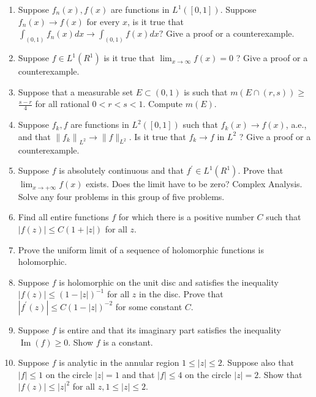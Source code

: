 \documentclass[10pt]{article}
\begin{document}
\begin{enumerate}
  \item Suppose $f_{n}(x), f(x)$ are functions in $L^{1}([0,1])$. Suppose $f_{n}(x) \rightarrow f(x)$ for every $x$, is it true that $\int_{(0,1)} f_{n}(x) d x \rightarrow \int_{(0,1)} f(x) d x ?$ Give a proof or a counterexample.

  \item Suppose $f \in L^{1}\left(R^{1}\right)$ is it true that $\lim _{x \rightarrow \infty} f(x)=0$ ? Give a proof or a counterexample.

  \item Suppose that a measurable set $E \subset(0,1)$ is such that $m(E \cap(r, s)) \geq$ $\frac{s-r}{4}$ for all rational $0<r<s<1$. Compute $m(E)$.

  \item Suppose $f_{k}, f$ are functions in $L^{2}([0,1])$ such that $f_{k}(x) \rightarrow f(x)$, a.e., and that $\left\|f_{k}\right\|_{L^{2}} \rightarrow\|f\|_{L^{2}}$. Is it true that $f_{k} \rightarrow f$ in $L^{2}$ ? Give a proof or a counterexample.

  \item Suppose $f$ is absolutely continuous and that $f^{\prime} \in L^{1}\left(R^{1}\right)$. Prove that $\lim _{x \rightarrow+\infty} f(x)$ exists. Does the limit have to be zero? Complex Analysis. Solve any four problems in this group of five problems.

  \item Find all entire functions $f$ for which there is a positive number $C$ such that $|f(z)| \leq C(1+|z|)$ for all $z$.

  \item Prove the uniform limit of a sequence of holomorphic functions is holomorphic.

  \item Suppose $f$ is holomorphic on the unit disc and satisfies the inequality $|f(z)| \leq(1-|z|)^{-1}$ for all $z$ in the disc. Prove that $\left|f^{\prime}(z)\right| \leq C(1-|z|)^{-2}$ for some constant $C$.

  \item Suppose $f$ is entire and that its imaginary part satisfies the inequality $\operatorname{Im}(f) \geq 0$. Show $f$ is a constant.

  \item Suppose $f$ is analytic in the annular region $1 \leq|z| \leq 2$. Suppose also that $|f| \leq 1$ on the circle $|z|=1$ and that $|f| \leq 4$ on the circle $|z|=2$. Show that $|f(z)| \leq|z|^{2}$ for all $z, 1 \leq|z| \leq 2$.

\end{enumerate}
\end{document}
